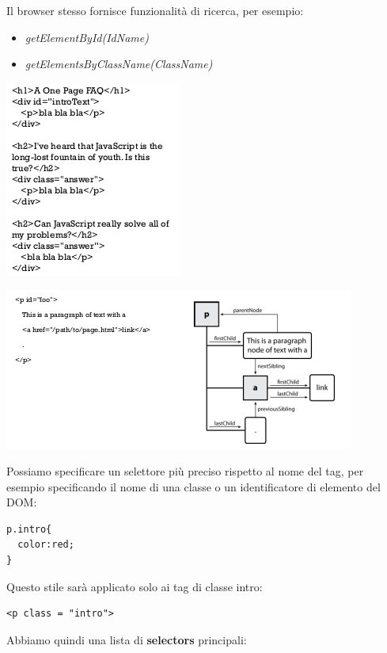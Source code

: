 \documentclass[a4paper,12pt, oneside]{book}
\begin{document}
Il browser stesso fornisce funzionalità di ricerca, per esempio:
\begin{itemize}
	\item \textit{getElementById(IdName)}
	\item \textit{getElementsByClassName(ClassName)}
\end{itemize}
\begin{center}
	\includegraphics[scale=2.9]{img/dom2.png}
\end{center}
\begin{center}
	\includegraphics[scale=0.9]{img/dom3.png}
\end{center}
\newpage
Possiamo specificare un selettore più preciso rispetto al
nome del tag, per esempio specificando il nome di una
classe o un identificatore di elemento del DOM:
\begin{verbatim}
p.intro{
  color:red;
}
\end{verbatim}
Questo stile sarà applicato solo ai tag di classe intro:
\begin{verbatim}
<p class = "intro">
\end{verbatim}
Abbiamo quindi una lista di \textbf{selectors} principali:
\end{document}
